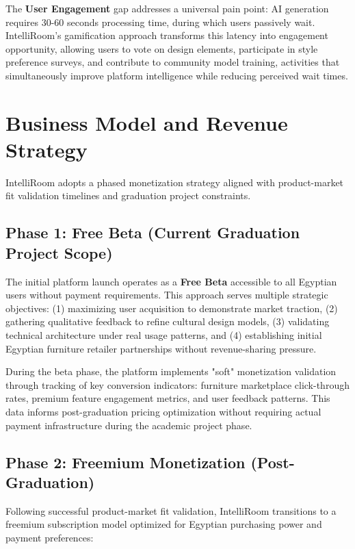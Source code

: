 The \textbf{User Engagement} gap addresses a universal pain point: AI generation requires 30-60 seconds processing time, during which users passively wait. IntelliRoom's gamification approach transforms this latency into engagement opportunity, allowing users to vote on design elements, participate in style preference surveys, and contribute to community model training, activities that simultaneously improve platform intelligence while reducing perceived wait times.

\section{Business Model and Revenue Strategy}
\label{sec:app_business_model}

IntelliRoom adopts a phased monetization strategy aligned with product-market fit validation timelines and graduation project constraints.

\subsection{Phase 1: Free Beta (Current Graduation Project Scope)}

The initial platform launch operates as a \textbf{Free Beta} accessible to all Egyptian users without payment requirements. This approach serves multiple strategic objectives: (1) maximizing user acquisition to demonstrate market traction, (2) gathering qualitative feedback to refine cultural design models, (3) validating technical architecture under real usage patterns, and (4) establishing initial Egyptian furniture retailer partnerships without revenue-sharing pressure.

During the beta phase, the platform implements "soft" monetization validation through tracking of key conversion indicators: furniture marketplace click-through rates, premium feature engagement metrics, and user feedback patterns. This data informs post-graduation pricing optimization without requiring actual payment infrastructure during the academic project phase.

\subsection{Phase 2: Freemium Monetization (Post-Graduation)}

Following successful product-market fit validation, IntelliRoom transitions to a freemium subscription model optimized for Egyptian purchasing power and payment preferences:

